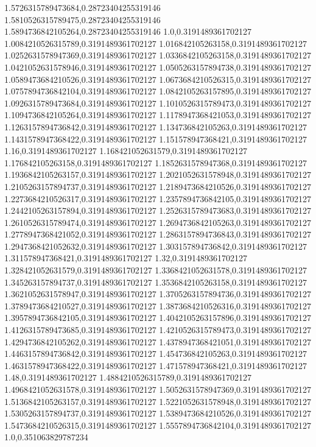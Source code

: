 1.5726315789473684,0.28723404255319146
1.5810526315789475,0.28723404255319146
1.5894736842105264,0.28723404255319146
1.0,0.3191489361702127
1.0084210526315789,0.3191489361702127
1.016842105263158,0.3191489361702127
1.0252631578947369,0.3191489361702127
1.0336842105263158,0.3191489361702127
1.0421052631578946,0.3191489361702127
1.0505263157894738,0.3191489361702127
1.0589473684210526,0.3191489361702127
1.0673684210526315,0.3191489361702127
1.0757894736842104,0.3191489361702127
1.0842105263157895,0.3191489361702127
1.0926315789473684,0.3191489361702127
1.1010526315789473,0.3191489361702127
1.1094736842105264,0.3191489361702127
1.1178947368421053,0.3191489361702127
1.1263157894736842,0.3191489361702127
1.134736842105263,0.3191489361702127
1.1431578947368422,0.3191489361702127
1.151578947368421,0.3191489361702127
1.16,0.3191489361702127
1.168421052631579,0.3191489361702127
1.176842105263158,0.3191489361702127
1.1852631578947368,0.3191489361702127
1.1936842105263157,0.3191489361702127
1.2021052631578948,0.3191489361702127
1.2105263157894737,0.3191489361702127
1.2189473684210526,0.3191489361702127
1.2273684210526317,0.3191489361702127
1.2357894736842105,0.3191489361702127
1.2442105263157894,0.3191489361702127
1.2526315789473683,0.3191489361702127
1.2610526315789474,0.3191489361702127
1.2694736842105263,0.3191489361702127
1.2778947368421052,0.3191489361702127
1.2863157894736843,0.3191489361702127
1.2947368421052632,0.3191489361702127
1.303157894736842,0.3191489361702127
1.311578947368421,0.3191489361702127
1.32,0.3191489361702127
1.328421052631579,0.3191489361702127
1.3368421052631578,0.3191489361702127
1.345263157894737,0.3191489361702127
1.3536842105263158,0.3191489361702127
1.3621052631578947,0.3191489361702127
1.3705263157894736,0.3191489361702127
1.3789473684210527,0.3191489361702127
1.3873684210526316,0.3191489361702127
1.3957894736842105,0.3191489361702127
1.4042105263157896,0.3191489361702127
1.4126315789473685,0.3191489361702127
1.4210526315789473,0.3191489361702127
1.4294736842105262,0.3191489361702127
1.4378947368421051,0.3191489361702127
1.4463157894736842,0.3191489361702127
1.454736842105263,0.3191489361702127
1.4631578947368422,0.3191489361702127
1.471578947368421,0.3191489361702127
1.48,0.3191489361702127
1.4884210526315789,0.3191489361702127
1.4968421052631578,0.3191489361702127
1.5052631578947369,0.3191489361702127
1.5136842105263157,0.3191489361702127
1.5221052631578948,0.3191489361702127
1.5305263157894737,0.3191489361702127
1.5389473684210526,0.3191489361702127
1.5473684210526315,0.3191489361702127
1.5557894736842104,0.3191489361702127
1.0,0.351063829787234
